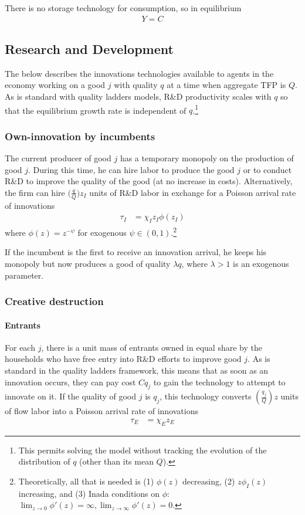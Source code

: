 \documentclass[11pt,english]{article}
\theoremstyle{remark}
\begin{document}
There is no storage technology for consumption, so in equilibrium 
\begin{align*}
Y = C
\end{align*}

\subsection{Research and Development}

The below describes the innovations technologies available to agents in the economy working on a good $j$ with quality $q$ at a time when aggregate TFP is $Q$. As is standard with quality ladders models, R\&D productivity scales with $q$ so that the equilibrium growth rate is independent of $q$.\footnote{This permits solving the model without tracking the evolution of the distribution of $q$ (other than its mean $Q$).}

\subsubsection{Own-innovation by incumbents}

The current producer of good $j$ has a temporary monopoly on the production of good $j$. During this time, he can hire labor to produce the good $j$ or to conduct R\&D to improve the quality of the good (at no increase in costs). Alternatively, the firm can hire $\big(\frac{q}{Q}\big)z_I$ units of R\&D labor in exchange for a Poisson arrival rate of innovations
\begin{align}
\tau_I &= \chi_I z_I \phi(z_I)  \label{incumbent_innovation_rate}
\end{align}
where $\phi(z) = z^{-\psi}$ for exogenous $\psi \in (0,1)$.\footnote{Theoretically, all that is needed is (1) $\phi(z)$ decreasing, (2) $z\phi_I(z)$ increasing, and (3) Inada conditions on $\phi$: $\lim_{z \to 0} \phi'(z) = \infty, \lim_{z \to \infty} \phi'(z) = 0$.}

If the incumbent is the first to receive an innovation arrival, he keeps his monopoly but now produces a good of quality $\lambda q$, where $\lambda > 1$ is an exogenous parameter. 

\subsubsection{Creative destruction}

\paragraph{Entrants} For each $j$, there is a unit mass of entrants owned in equal share by the households who have free entry into R\&D efforts to improve good $j$. As is standard in the quality ladders framework, this means that as soon as an innovation occurs, they can pay cost $Cq_j$ to gain the technology to attempt to innovate on it. If the quality of good $j$ is $q_j$, this technology converts $(\frac{q_j}{Q}) z$ units of flow labor into a Poisson arrival rate of innovations
\begin{align}
	\tau_E &= \chi_E z_E \label{simplified_entrant_innovation_rate}
\end{align}
\end{document}
